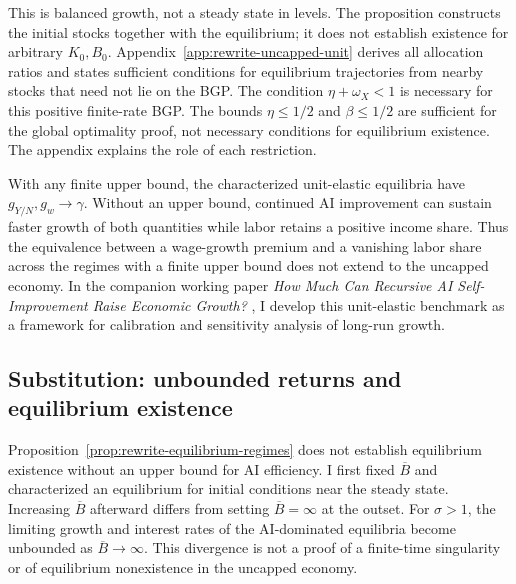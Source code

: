 This is balanced growth, not a steady state in levels. The proposition
constructs the initial stocks together with the equilibrium; it does not
establish existence for arbitrary $K_0,B_0$. Appendix~\ref{app:rewrite-uncapped-unit}
derives all allocation ratios and states sufficient conditions for
equilibrium trajectories from nearby stocks that need not lie on the BGP.
The condition $\eta+\omega_X<1$ is necessary for this positive finite-rate
BGP. The bounds $\eta\leq1/2$ and $\beta\leq1/2$ are sufficient for the
global optimality proof, not necessary conditions for equilibrium existence.
The appendix explains the role of each restriction.

With any finite upper bound, the characterized unit-elastic equilibria have
$g_{Y/N},g_w\to\gamma$. Without an upper bound, continued AI improvement can
sustain faster growth of both quantities while labor retains a positive
income share. Thus the equivalence between a wage-growth premium and a
vanishing labor share across the regimes with a finite upper bound does not extend
to the uncapped economy. In the companion working paper
\emph{How Much Can Recursive AI Self-Improvement Raise Economic Growth?}
\citep{pardo2026companion}, I develop this unit-elastic benchmark as a framework
for calibration and sensitivity analysis of long-run growth.

\subsection{Substitution: unbounded returns and equilibrium existence}
\label{subsec:rewrite-uncapped}

Proposition~\ref{prop:rewrite-equilibrium-regimes} does not establish equilibrium existence without an upper bound for AI efficiency. I first fixed $\overline B$ and characterized an equilibrium for initial conditions near the steady state. Increasing $\overline B$ afterward differs from setting $\overline B=\infty$ at the outset. For $\sigma>1$, the limiting growth and interest rates of the AI-dominated equilibria become unbounded as $\overline B\to\infty$. This divergence is not a proof of a finite-time singularity or of equilibrium nonexistence in the uncapped economy.

